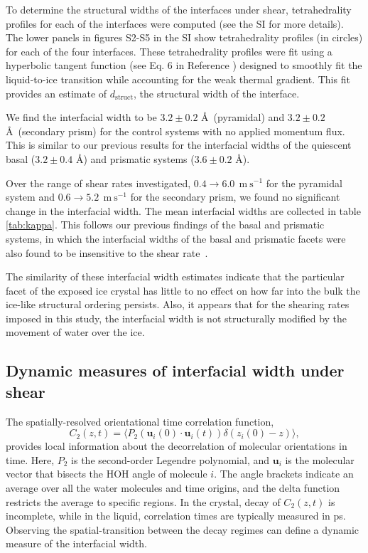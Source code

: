 \documentclass{pnastwo}
\begin{document}
\begin{article}
To determine the structural widths of the interfaces under shear,
tetrahedrality profiles for each of the interfaces were computed (see
the SI for more details). The lower panels in figures S2-S5 in the SI
show tetrahedrality profiles (in circles) for each of the four
interfaces.  These tetrahedrality profiles were fit using a hyperbolic
tangent function (see Eq. 6 in Reference \citealp{Louden13}) designed
to smoothly fit the liquid-to-ice transition while accounting for the
weak thermal gradient.  This fit provides an estimate of
$d_\mathrm{struct}$, the structural width of the interface.
 
We find the interfacial width to be $3.2 \pm 0.2$ \AA\ (pyramidal) and
$3.2 \pm 0.2$ \AA\ (secondary prism) for the control systems with no
applied momentum flux. This is similar to our previous results for the
interfacial widths of the quiescent basal ($3.2 \pm 0.4$ \AA) and
prismatic systems ($3.6 \pm 0.2$ \AA).

Over the range of shear rates investigated, $0.4 \rightarrow
6.0~\mathrm{~m~s}^{-1}$ for the pyramidal system and $0.6 \rightarrow
5.2~\mathrm{~m~s}^{-1}$ for the secondary prism, we found no
significant change in the interfacial width. The mean interfacial
widths are collected in table \ref{tab:kappa}. This follows our
previous findings of the basal and prismatic systems, in which the
interfacial widths of the basal and prismatic facets were also found
to be insensitive to the shear rate~\cite{Louden13}.

The similarity of these interfacial width estimates indicate that the
particular facet of the exposed ice crystal has little to no effect on
how far into the bulk the ice-like structural ordering persists. Also,
it appears that for the shearing rates imposed in this study, the
interfacial width is not structurally modified by the movement of
water over the ice.

\subsection{Dynamic measures of interfacial width under shear}
The spatially-resolved orientational time correlation function,
\begin{equation}\label{C(t)1}
  C_{2}(z,t)=\langle P_{2}(\mathbf{u}_i(0)\cdot \mathbf{u}_i(t))
  \delta(z_i(0) - z) \rangle,
\end{equation}
provides local information about the decorrelation of molecular
orientations in time. Here, $P_{2}$ is the second-order Legendre
polynomial, and $\mathbf{u}_i$ is the molecular vector that bisects
the HOH angle of molecule $i$.  The angle brackets indicate an average
over all the water molecules and time origins, and the delta function
restricts the average to specific regions. In the crystal, decay of
$C_2(z,t)$ is incomplete, while in the liquid, correlation times are
typically measured in ps.  Observing the spatial-transition between
the decay regimes can define a dynamic measure of the interfacial
width.


\end{article}
\end{document}

